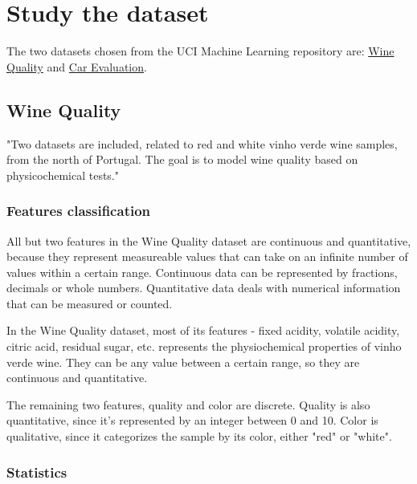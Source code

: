 \section{Study the dataset}

The two datasets chosen from the UCI Machine Learning repository are:
\href{https://archive.ics.uci.edu/dataset/186/wine+quality}{Wine Quality}
and \href{https://archive.ics.uci.edu/dataset/19/car+evaluation}{Car Evaluation}.

\subsection{Wine Quality}

"Two datasets are included, related to red and white vinho verde wine samples,
from the north of Portugal. The goal is to model wine quality based on
physicochemical tests."

\subsubsection{Features classification}

All but two features in the Wine Quality dataset are continuous and
quantitative, because they represent measureable values that can
take on an infinite number of values within a certain range.
Continuous data can be represented by fractions, decimals or whole
numbers. Quantitative data deals with numerical information that
can be measured or counted.

In the Wine Quality dataset, most of its features - fixed acidity,
volatile acidity, citric acid, residual sugar, etc. represents
the physiochemical properties of vinho verde wine. They can be any
value between a certain range, so they are continuous and
quantitative.

The remaining two features, quality and color are discrete. Quality
is also quantitative, since it's represented by an integer between
0 and 10. Color is qualitative, since it categorizes the sample by
its color, either "red" or "white".

\subsubsection{Statistics}

